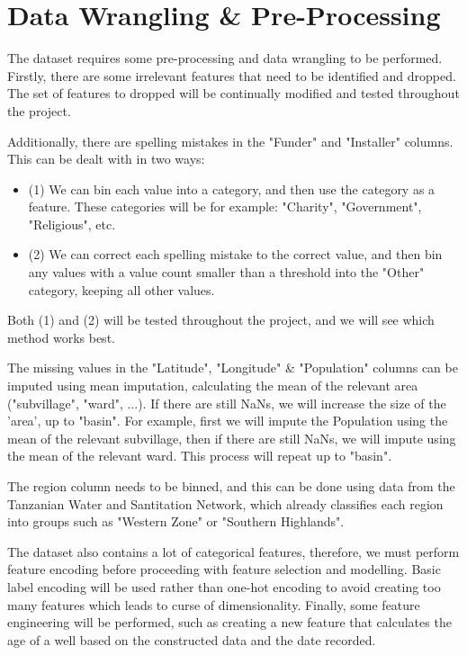 \documentclass{article}
\begin{document}
\section{Data Wrangling \& Pre-Processing}

The dataset requires some pre-processing and data wrangling to be performed. Firstly, there are some irrelevant features that need to be identified and dropped. The set of features to dropped will be continually modified and tested throughout the project.

Additionally, there are spelling mistakes in the "Funder" and "Installer" columns. This can be dealt with in two ways:
    \begin{itemize}
        \item (1) We can bin each value into a category, and then use the category as a feature. These categories will be for example: "Charity", "Government", "Religious", etc.
        \item (2) We can correct each spelling mistake to the correct value, and then bin any values with a value count smaller than a threshold into the "Other" category, keeping all other values.
    \end{itemize}

Both (1) and (2) will be tested throughout the project, and we will see which method works best. 


The missing values in the "Latitude", "Longitude" \& "Population" columns can be imputed using mean imputation, calculating the mean of the relevant area ("subvillage", "ward", ...). If there are still NaNs, we will increase the size of the 'area', up to "basin". For example, first we will impute the Population using the mean of the relevant subvillage, then if there are still NaNs, we will impute using the mean of the relevant ward. This process will repeat up to "basin".

The region column needs to be binned, and this can be done using data from the Tanzanian Water and Santitation Network, which already classifies each region into groups such as "Western Zone" or "Southern Highlands".

The dataset also contains a lot of categorical features, therefore, we must perform feature encoding before proceeding with feature selection and modelling. Basic label encoding will be used rather than one-hot encoding to avoid creating too many features which leads to curse of dimensionality. Finally, some feature engineering will be performed, such as creating a new feature that calculates the age of a well based on the constructed data and the date recorded.
\end{document}
